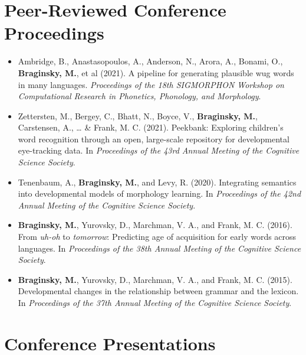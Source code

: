 \documentclass[11pt,]{article}
\begin{document}
\section{Peer-Reviewed Conference
Proceedings}\label{peer-reviewed-conference-proceedings}

\begin{itemize}
\item
  Ambridge, B., Anastasopoulos, A., Anderson, N., Arora, A., Bonami, O.,
  \textbf{Braginsky, M.}, et al (2021). A pipeline for generating
  plausible wug words in many languages. \emph{Proceedings of the 18th
  SIGMORPHON Workshop on Computational Research in Phonetics, Phonology,
  and Morphology}.
\item
  Zettersten, M., Bergey, C., Bhatt, N., Boyce, V., \textbf{Braginsky,
  M.}, Carstensen, A., \ldots{} \& Frank, M. C. (2021). Peekbank:
  Exploring children's word recognition through an open, large-scale
  repository for developmental eye-tracking data. In \emph{Proceedings
  of the 43rd Annual Meeting of the Cognitive Science Society}.
\item
  Tenenbaum, A., \textbf{Braginsky, M.}, and Levy, R. (2020).
  Integrating semantics into developmental models of morphology
  learning. In \emph{Proceedings of the 42nd Annual Meeting of the
  Cognitive Science Society}.
\item
  \textbf{Braginsky, M.}, Yurovsky, D., Marchman, V. A., and Frank, M.
  C. (2016). From \emph{uh-oh} to \emph{tomorrow}: Predicting age of
  acquisition for early words across languages. In \emph{Proceedings of
  the 38th Annual Meeting of the Cognitive Science Society}.
\item
  \textbf{Braginsky, M.}, Yurovsky, D., Marchman, V. A., and Frank, M.
  C. (2015). Developmental changes in the relationship between grammar
  and the lexicon. In \emph{Proceedings of the 37th Annual Meeting of
  the Cognitive Science Society}.
\end{itemize}

\section{Conference Presentations}\label{conference-presentations}
\end{document}

